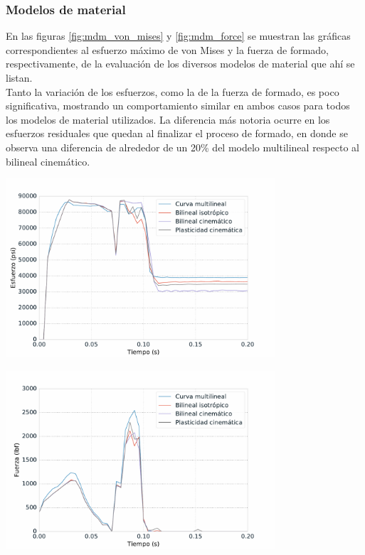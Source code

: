 \subsubsection{Modelos de material}

En las figuras  \ref{fig:mdm_von_mises} y \ref{fig:mdm_force} se muestran las gráficas correspondientes 
al esfuerzo máximo de von Mises y la fuerza de formado, respectivamente, de la evaluación de los diversos 
modelos de material que ahí se listan.\\

Tanto la variación de los esfuerzos, como la de la fuerza de formado, es poco significativa, mostrando 
un comportamiento similar en ambos casos para todos los modelos de material utilizados. La 
diferencia más notoria ocurre en los esfuerzos residuales que quedan al finalizar el proceso 
de formado, en donde se observa una diferencia de alrededor de un 20\% del modelo multilineal 
respecto al bilineal cinemático.

\begin{center}
\includegraphics[width=0.75\textwidth]{src/ch4/mdm_von_mises.pdf}
\label{fig:mdm_von_mises}
\end{center}

\begin{center}
\includegraphics[width=0.75\textwidth]{src/ch4/mdm_force.pdf}
\label{fig:mdm_force}
\end{center}

